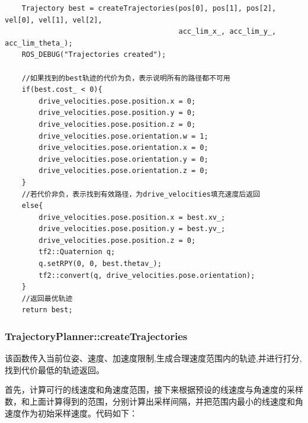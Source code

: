 \documentclass[9pt, oneside]{book}
\begin{document}
\footnotesize
\begin{verbatim}
    Trajectory best = createTrajectories(pos[0], pos[1], pos[2], vel[0], vel[1], vel[2],
                                         acc_lim_x_, acc_lim_y_, acc_lim_theta_);
    ROS_DEBUG("Trajectories created");

    //如果找到的best轨迹的代价为负，表示说明所有的路径都不可用
    if(best.cost_ < 0){
        drive_velocities.pose.position.x = 0;
        drive_velocities.pose.position.y = 0;
        drive_velocities.pose.position.z = 0;
        drive_velocities.pose.orientation.w = 1;
        drive_velocities.pose.orientation.x = 0;
        drive_velocities.pose.orientation.y = 0;
        drive_velocities.pose.orientation.z = 0;
    }
    //若代价非负，表示找到有效路径，为drive_velocities填充速度后返回
    else{
        drive_velocities.pose.position.x = best.xv_;
        drive_velocities.pose.position.y = best.yv_;
        drive_velocities.pose.position.z = 0;
        tf2::Quaternion q;
        q.setRPY(0, 0, best.thetav_);
        tf2::convert(q, drive_velocities.pose.orientation);
    }
    //返回最优轨迹
    return best;
\end{verbatim}
\normalsize

\subsubsection{TrajectoryPlanner::createTrajectories}

该函数传入当前位姿、速度、加速度限制,生成合理速度范围内的轨迹,并进行打分,找到代价最低的轨迹返回。

首先，计算可行的线速度和角速度范围，接下来根据预设的线速度与角速度的采样数，和上面计算得到的范围，分别计算出采样间隔，并把范围内最小的线速度和角速度作为初始采样速度。代码如下：
\end{document}
